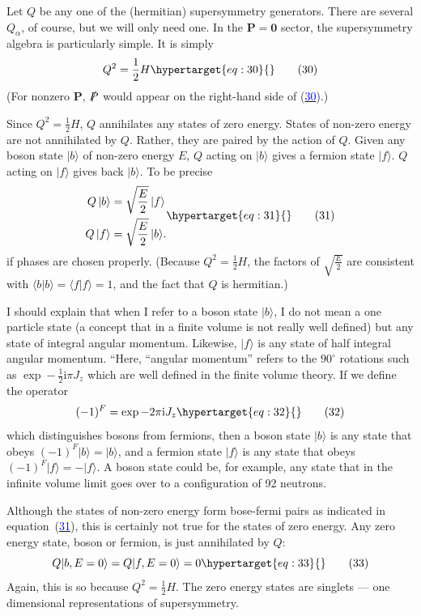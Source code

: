 \documentclass[11pt,a4paper]{article}
\newcommand{\eqtarget}[1]{\hypertarget{eq:#1}{\mathstrut}\tag{#1}}
\newcommand{\eqnref}[1]{(\hyperlink{eq:#1}{\textcolor{blue}{#1}})}
\newcommand{\ii}{\mathrm{i}}
\begin{document}
Let $Q$ be any one of the (hermitian) supersymmetry generators.
There are several $Q_\alpha$, of course, but we will only need one. In the
$\mathbf P = \mathbf 0$ sector, the supersymmetry algebra is particularly simple. It
is simply
\begin{equation}
Q^2 = \frac{1}{2} H
\eqtarget{30}
\end{equation}
(For nonzero $\mathbf P$, $\slashed{P}$ would appear on the right-hand side of \eqnref{30}.)

Since $Q^2 = \frac{1}{2} H$, $Q$ annihilates any states of zero energy. States
of non-zero energy are not annihilated by $Q$. Rather, they are paired
by the action of $Q$. Given any boson state $|b\rangle$ of non-zero energy $E$,
$Q$ acting on $|b\rangle$ gives a fermion state $|f\rangle$. $Q$ acting on $|f\rangle$ gives
back $|b\rangle$. To be precise
\begin{equation}
\begin{aligned}
Q\, |b\rangle &= \sqrt{\frac{E}{2}}\, |f\rangle \\
Q\, |f\rangle &= \sqrt{\frac{E}{2}}\, |b\rangle .
\end{aligned}
\eqtarget{31}
\end{equation}
if phases are chosen properly. (Because $Q^2 = \frac{1}{2} H$, the factors of
$\sqrt{\frac{E}{2}}$ are consistent with $\langle b|b\rangle = \langle f|f\rangle = 1$, and the fact that $Q$ is
hermitian.)

I should explain that when I refer to a boson state $|b\rangle$, I do
not mean a one particle state (a concept that in a finite volume is
not really well defined) but any state of integral angular momentum.
Likewise, $|f\rangle$ is any state of half integral angular momentum. ``Here,
``angular momentum'' refers to the $90^\circ$ rotations such as $\exp - \frac{1}{2} \ii\pi J_z$
which are well defined in the finite volume theory. If we define
the operator
\begin{equation}
(-1)^F = \exp - 2\pi \ii J_z
\eqtarget{32}
\end{equation}
which distinguishes bosons from fermions, then a boson state $|b\rangle$ is
any state that obeys $(-1)^F |b\rangle = |b\rangle$, and a fermion state $|f\rangle$ is any
state that obeys $(-1)^F |f\rangle = -|f\rangle$. A boson state could be, for
example, any state that in the infinite volume limit goes over to a
configuration of 92 neutrons.

Although the states of non-zero energy form bose-fermi pairs
as indicated in equation~\eqnref{31}, this is certainly not true for the
states of zero energy. Any zero energy state, boson or fermion, is
just annihilated by $Q$:
\begin{equation}
Q|b, E = 0\rangle = Q|f, E = 0\rangle = 0
\eqtarget{33}
\end{equation}
Again, this is so because $Q^2 = \frac{1}{2} H$. The zero energy states are
singlets --- one dimensional representations of supersymmetry.
\end{document}

